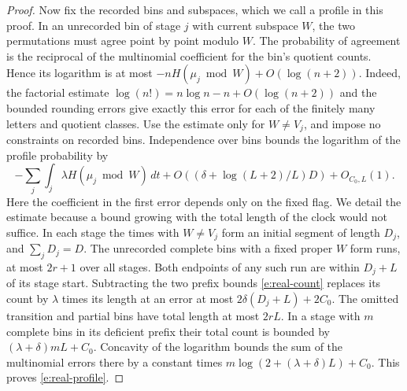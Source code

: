 \documentclass[11pt]{article}
\numberwithin{equation}{section}
\begin{document}
\begin{proof}
Now fix the recorded bins and subspaces, which we call a profile in
this proof. In an unrecorded bin of stage $j$ with current subspace $W$,
the two permutations must agree point by point modulo $W$. The
probability of agreement is the reciprocal of the multinomial
coefficient for the bin's quotient counts. Hence its logarithm is
at most $-nH(\mu_j\bmod W)+O(\log(n+2))$. Indeed, the factorial
estimate $\log(n!)=n\log n-n+O(\log(n+2))$ and the bounded rounding
errors give exactly this error for each of the finitely many letters
and quotient classes. Use the estimate only for $W\ne V_j$, and
impose no constraints on recorded bins. Independence over bins bounds
the logarithm of the profile probability by
\begin{equation}
 -\sum_j\int_j\lambda H(\mu_j\bmod W)\,dt
   +O\left((\delta+\log(L+2)/L)D\right)+O_{C_0,L}(1).
                                                               \label{e:real-profile}
\end{equation}
Here the coefficient in the first error depends only on the fixed
flag. We detail the estimate because a bound growing with the total
length of the clock would not suffice. In each stage the times with
$W\ne V_j$ form an initial segment of length $D_j$, and $\sum_jD_j=D$.
The unrecorded complete bins with a fixed proper $W$ form runs, at
most $2r+1$ over all stages. Both endpoints of any such run are
within $D_j+L$ of its stage start. Subtracting the two prefix bounds
\eqref{e:real-count} replaces its count by $\lambda$ times its length
at an error at most $2\delta(D_j+L)+2C_0$. The omitted transition
and partial bins have total length at most $2rL$. In a stage with $m$
complete bins in its deficient prefix their total count is bounded
by $(\lambda+\delta)mL+C_0$. Concavity of the logarithm bounds the
sum of the multinomial errors there by a constant times
$m\log(2+(\lambda+\delta)L)+C_0$. This proves \eqref{e:real-profile}.


\end{proof}
\end{document}
